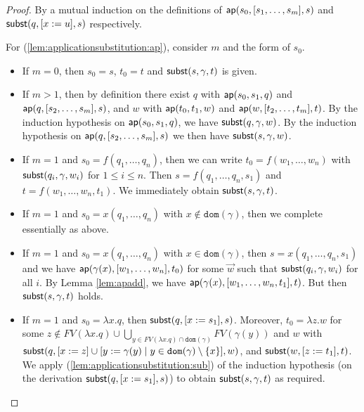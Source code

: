 \documentclass{lmcs}
\theoremstyle{theorem}\newtheorem{theorem}[dummy]{Theorem}
\theoremstyle{theorem}\newtheorem{lemma}[dummy]{Lemma}
\theoremstyle{theorem}\newtheorem{corollary}[dummy]{Corollary}
\theoremstyle{definition}\newtheorem{definition}[dummy]{Definition}
\theoremstyle{definition}\newtheorem{example}[dummy]{Example}
\newcommand{\FV}{\mathit{FV}}
\newcommand{\domain}{\mathtt{dom}}
\newcommand{\abs}[2]{\lambda #1.#2}
\begin{document}
\begin{proof}
By a mutual induction on the definitions of $\mathsf{ap}(s_0,[s_1,\dots,s_m],s)$ and
$\mathsf{subst}(q,[x:=u],s)$ respectively.

For (\ref{lem:applicationsubstitution:ap}), consider $m$ and the form of $s_0$.
\begin{itemize}
\item If $m = 0$, then $s_0 = s$, $t_0 = t$ and $\mathsf{subst}(s,\gamma,t)$ is given.
\item If $m > 1$, then by definition there exist $q$ with $\mathsf{ap}(s_0,s_1,q)$ and
  $\mathsf{ap}(q,[s_2,\dots,s_m],s)$, and $w$ with $\mathsf{ap}(t_0,t_1,w)$ and $\mathsf{ap}(w,
  [t_2,\dots,t_m],t)$. By the induction hypothesis on $\mathsf{ap}(s_0,s_1,q)$, we have
  $\mathsf{subst}(q,\gamma,w)$.  By the induction hypothesis on $\mathsf{ap}(q,[s_2,\dots,s_m],s)$ we
  then have $\mathsf{subst}(s,\gamma,w)$.
\item If $m = 1$ and $s_0 = f(q_1,\dots,q_n)$, then we can write $t_0 = f(w_1,\dots,w_n)$
  with $\mathsf{subst}(q_i,\gamma,w_i)$ for $1 \leq i \leq n$. Then $s = f(q_1,\dots,q_n,s_1)$ and
  $t = f(w_1,\dots,w_n,t_1)$.  We immediately obtain $\mathsf{subst}(s,\gamma,t)$.
\item If $m = 1$ and $s_0 = x(q_1,\dots,q_n)$ with $x \notin \domain(\gamma)$, then we complete
  essentially as above.
\item If $m = 1$ and $s_0 = x(q_1,\dots,q_n)$ with $x \in \domain(\gamma)$, then $s = x(q_1,
  \dots,q_n,s_1)$ and we have $\mathsf{ap}(\gamma(x),[w_1,\dots,w_n],t_0)$ for some $\vec{w}$ such
  that $\mathsf{subst}(q_i,\gamma,w_i)$ for all $i$. By Lemma \ref{lem:apadd}, we have
  $\mathsf{ap}(\gamma(x),[w_1,\dots,w_n,t_1],t)$. But then $\mathsf{subst}(s,\gamma,t)$ holds.
\item If $m = 1$ and $s_0 = \abs{x}{q}$, then $\mathsf{subst}(q,[x:=s_1],s)$.  Moreover, $t_0 =
  \abs{z}{w}$ for some $z \notin \FV(\abs{x}{q}) \cup \bigcup_{y \in \FV(\abs{x}{q}) \cap
  \domain(\gamma)} \FV(\gamma(y))$ and $w$ with $\subrel{q,[x:=z] \cup [y:=\gamma(y) \mid
  y \in \domain(\gamma) \setminus \{x\}], w}$, and $\mathsf{subst}(w,[z:=t_1],t)$.
  We apply (\ref{lem:applicationsubstitution:sub}) of the induction hypothesis (on the
  derivation $\mathsf{subst}(q,[x:=s_1],s)$) to obtain $\mathsf{subst}(s,\gamma,t)$ as required.
\end{itemize}


\end{proof}
\end{document}
